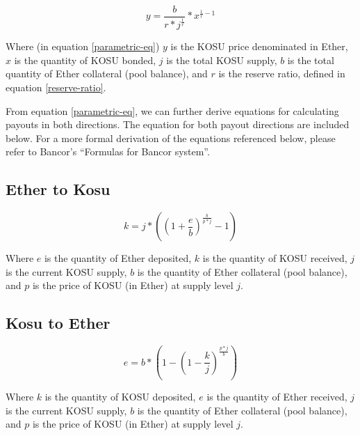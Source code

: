 \documentclass[10pt]{article}
\begin{document}
\begin{equation}\label{parametric-eq}
  y = \frac{b}{r*j^{\frac{1}{r}}}*x^{\frac{1}{r}-1}
\end{equation}

Where (in equation \ref{parametric-eq}) $y$ is the KOSU price denominated in Ether, $x$ is the quantity of KOSU bonded, $j$ is the total KOSU supply, $b$ is the total quantity of Ether collateral (pool balance), and $r$ is the reserve ratio, defined in equation \ref{reserve-ratio}.
\medskip 

From equation \ref{parametric-eq}, we can further derive equations for calculating payouts in both directions. The equation for both payout directions are included below. For a more formal derivation of the equations referenced below, please refer to Bancor’s ``Formulas for Bancor system''\cite{bancor-formulas}. 
\subsection{Ether to Kosu}\label{token-distribution-eth-kosu}
\begin{equation}
  k = j* ((1+\frac{e}{b})^{\frac{b}{p*j}} - 1)
\end{equation}
\medskip

Where $e$ is the quantity of Ether deposited, $k$ is the quantity of KOSU received, $j$ is the current KOSU supply, $b$ is the quantity of Ether collateral (pool balance), and $p$ is the price of KOSU (in Ether) at supply level $j$. 
\subsection{Kosu to Ether}\label{token-distribution-kosu-eth}
\begin{equation}
  e = b* (1-(1-\frac{k}{j})^{\frac{p*j}{b}})
\end{equation}
\medskip

Where $k$ is the quantity of KOSU deposited, $e$ is the quantity of Ether received, $j$ is the current KOSU supply, $b$ is the quantity of Ether collateral (pool balance), and $p$ is the price of KOSU (in Ether) at supply level $j$. 
\clearpage
\pagebreak


\end{document}

